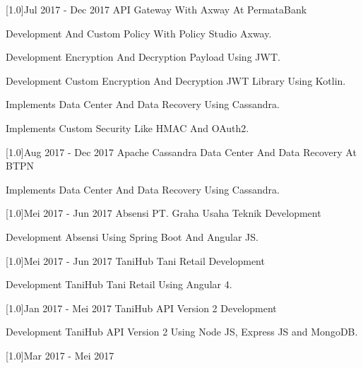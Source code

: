 \documentclass[english]{cv-style}
\begin{document}
\begin{entrylist}
{\scalebox{.6}[1.0]{Jul 2017 - Dec 2017}}
{API Gateway With Axway At PermataBank}
{}
{\vspace{-0.3cm}
  \begin{itemize}\small{
    \item Development And Custom Policy With Policy Studio Axway.
    \item Development Encryption And Decryption Payload Using JWT.
    \item Development Custom Encryption And Decryption JWT Library Using Kotlin.
    \item Implements Data Center And Data Recovery Using Cassandra.
    \item Implements Custom Security Like HMAC And OAuth2.}
  \end{itemize}}
\entry
{\scalebox{.6}[1.0]{Aug 2017 - Dec 2017}}
{Apache Cassandra Data Center And Data Recovery At BTPN}
{}
{\vspace{-0.3cm}
  \begin{itemize}\small{
    \item Implements Data Center And Data Recovery Using Cassandra.}
  \end{itemize}}
\entry
{\scalebox{.6}[1.0]{Mei 2017 - Jun 2017}}
{Absensi PT. Graha Usaha Teknik Development}
{}
{\vspace{-0.3cm}
  \begin{itemize}\small{
    \item Development Absensi Using Spring Boot And Angular JS.}
  \end{itemize}}
\entry
{\scalebox{.6}[1.0]{Mei 2017 - Jun 2017}}
{TaniHub Tani Retail Development}
{}
{\vspace{-0.3cm}
  \begin{itemize}\small{
    \item Development TaniHub Tani Retail Using Angular 4.}
  \end{itemize}}
\entry
{\scalebox{.6}[1.0]{Jan 2017 - Mei 2017}}
{TaniHub API Version 2 Development}
{}
{\vspace{-0.3cm}
  \begin{itemize}\small{
    \item Development TaniHub API Version 2 Using Node JS, Express JS and MongoDB.}
  \end{itemize}}
\entry
{\scalebox{.6}[1.0]{Mar 2017 - Mei 2017}}

\end{entrylist}
\end{document}
